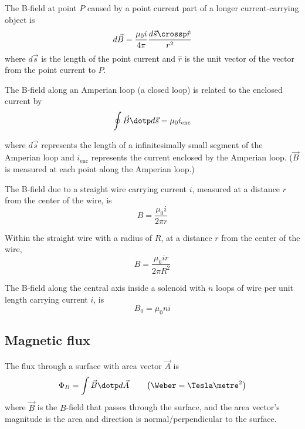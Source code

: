 \begin{namedlaw}
  The B-field at point $P$ caused by a point current part of a longer current-carrying object is
  \[
    d\vec{B} = \frac{\mu_0 i}{4 \pi} \frac{d\vec{s} \crossp \hat{r}}{r^2}
  \]
  where $d\vec{s}$ is the length of the point current and $\hat{r}$ is the unit vector of the vector from the point current to $P$.
\end{namedlaw}

\begin{namedlaw}
  The B-field along an Amperian loop (a closed loop) is related to the enclosed current by
  \[
    \oint \vec{B} \dotp d\vec{s} = \mu_0 i_{\text{enc}}
  \]

  where $d\vec{s}$ represents the length of a infinitesimally small segment of the Amperian loop and $i_{\text{enc}}$ represents the current enclosed by the Amperian loop. ($\vec{B}$ is measured at each point along the Amperian loop.)
\end{namedlaw}

\begin{example}
  The B-field due to a straight wire carrying current $i$, measured at a distance $r$ from the center of the wire, is
  \[
    B = \frac{\mu_0 i}{2 \pi r}
  \]

  Within the straight wire with a radius of $R$, at a distance $r$ from the center of the wire,
  \[
    B = \frac{\mu_0 i r}{2 \pi R^2}
  \]
\end{example}

\begin{example}
  The B-field along the central axis inside a solenoid with $n$ loops of wire per unit length carrying current $i$, is
  \[
    B_0 = \mu_0 n i
  \]
\end{example}

\subsection{Magnetic flux}

\begin{definition}
  The flux through a surface with area vector $\vec{A}$ is
  \[
    \Phi_B = \int \vec{B} \dotp d\vec{A} \qquad \left(\Weber = \Tesla \metre^2\right)
  \]
  where $\vec{B}$ is the $B$-field that passes through the surface, and the area vector's magnitude is the area and direction is normal/perpendicular to the surface.
\end{definition}

